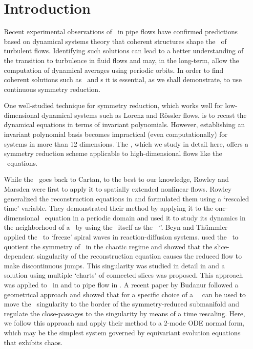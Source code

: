 \section{Introduction}
\label{s:intro}

Recent experimental observations of \reqva\ in pipe flows have confirmed
predictions based on dynamical systems theory that coherent structures shape 
the \statesp\ of turbulent flows. Identifying such solutions can lead to a better
understanding of the transition to turbulence in fluid flows and may, in the long-term,
allow the computation of dynamical averages using periodic orbits. In order to
find coherent solutions such as \reqva\ and \rpo s it is essential, as we shall demonstrate, 
to use continuous symmetry reduction.

One well-studied technique for symmetry reduction, which works well for low-dimensional dynamical systems such 
as Lorenz and R\"{o}ssler flows, is to recast the dynamical equations in terms of invariant polynomials. However, establishing an invariant polynomial basis becomes impractical (even computationally) for systems in more than 12 dimensions.
The \mslices%
,
which we study in detail here, offers a symmetry reduction
scheme applicable to high-dimensional flows like the \NS\ equations.

While the \mslices\ goes back to Cartan, to the
best to our knowledge, Rowley and Marsden
were first to apply it to spatially extended nonlinear flows. Rowley
\etal~ generalized the reconstruction equations
in  and formulated them using a `rescaled
time' variable. They demonstrated their method by applying it to the one-dimensional \KS\ equation
in a periodic domain and used it to study its dynamics in the neighborhood of a \reqv\ by using the \reqv\ itself as the \slice\ `\template'.  Beyn and
Th\"{u}mmler applied the \mslices\ to `freeze' spiral
waves in reaction-diffusion systems.
 used the \mslices\ to quotient the  symmetry of
\cLf\ in the chaotic regime and showed that the slice-dependent
singularity of the reconstruction equation causes the reduced flow to make
discontinuous jumps. This singularity was studied in detail in
 and a solution using multiple `charts' of connected
slices was proposed. This approach was applied to \cLf\
in  and to pipe flow in . A
recent paper by Budanur \etal{} followed a geometrical approach
and showed that for \SOn{2} a specific choice of a \slice\
\template\ can be used to move the \slice\ singularity to the border of the
symmetry-reduced submanifold and regulate the close-passages to the
singularity by means of a time rescaling. Here, we follow this approach
and apply their method to a 2-mode ODE normal form, which may be
the simplest system governed by \SOn{2} equivariant evolution equations
that exhibits chaos.

